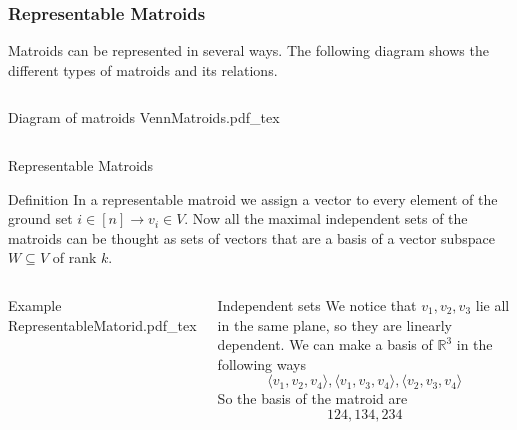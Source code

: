 \documentclass{beamer}
\newcommand{\incfig}[1]{%
\center
\def\svgwidth{0.9\columnwidth}
{#1.pdf_tex}
}
\begin{document}
\begin{frame}
\frametitle{Representable Matroids}
Matroids can be represented in several ways. The following diagram shows the different types of matroids and its relations.
\begin{columns}[c]
\begin{block}{Diagram of matroids}
\incfig{VennMatroids}
\end{block}
\end{columns}
\end{frame}

\begin{frame}{Representable Matroids}
\begin{block}{Definition}
  In a representable matroid we assign a vector to every element of the ground set $i\in [n] \to  v_i \in V$. Now all the maximal independent sets of the matroids can be thought as sets of vectors that are a basis of a vector subspace $W\subseteq V$ of rank $k$.
\end{block} 
\begin{columns}[c]
\begin{block}{Example}
\incfig{RepresentableMatorid}
\end{block}
\begin{block}{Independent sets}
We notice that $v_1, v_2, v_3$ lie all in the same plane, so they are linearly dependent.
We can make a basis of $\mathbb{R}^3$ in the following ways
\[
\langle v_1, v_2, v_4 \rangle , 
\langle v_1, v_3, v_4 \rangle ,
\langle v_2, v_3, v_4 \rangle
\] 
So the basis of the matroid are
\[
  124, 134, 234
\] 
\end{block}
\end{columns}
\end{frame}
\end{document}
